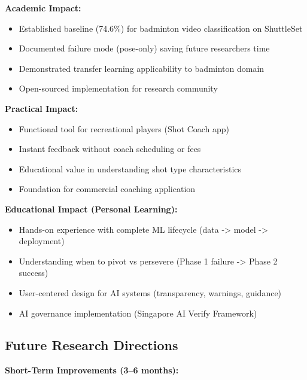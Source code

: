 \documentclass[11pt,a4paper]{article}
\begin{document}
\textbf{Academic Impact:}

\begin{itemize}
\item Established baseline (74.6\%) for badminton video classification on ShuttleSet
\item Documented failure mode (pose-only) saving future researchers time
\item Demonstrated transfer learning applicability to badminton domain
\item Open-sourced implementation for research community
\end{itemize}

\textbf{Practical Impact:}

\begin{itemize}
\item Functional tool for recreational players (Shot Coach app)
\item Instant feedback without coach scheduling or fees
\item Educational value in understanding shot type characteristics
\item Foundation for commercial coaching application
\end{itemize}

\textbf{Educational Impact (Personal Learning):}

\begin{itemize}
\item Hands-on experience with complete ML lifecycle (data -> model -> deployment)
\item Understanding when to pivot vs persevere (Phase 1 failure -> Phase 2 success)
\item User-centered design for AI systems (transparency, warnings, guidance)
\item AI governance implementation (Singapore AI Verify Framework)
\end{itemize}

\subsection{Future Research Directions}

\textbf{Short-Term Improvements (3--6 months):}
\end{document}
